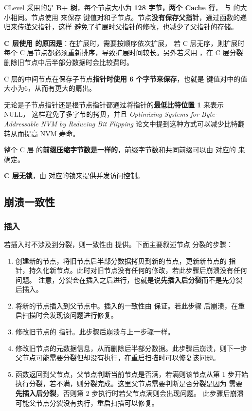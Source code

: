 \documentclass{mydoc}
\begin{document}
CLevel 采用的是 \textbf{B+ 树}，每个节点大小为 \textbf{128 字节，两个 Cache 行}，
与  的大小相同。节点使用 \textbf{} 来保存
键值对和子节点。节点\textbf{没有保存父指针}，通过函数的递归来传递父指针，这样
避免了扩展时父指针的修改，也减少了父指针的存储。

\textbf{C 层使用  的原因是}：在扩展时，需要按顺序依次扩展，
若 C 层无序，则扩展时每个 C 层节点都必须重新排序，导致扩展时间较长。另外若采用
，在 C 层分裂删除旧节点中后半部分数据时会比较费时。

C 层的中间节点在保存子节点\textbf{指针时使用 6 个字节来保存}，也就是 
键值对中的值大小为6，从而有更大的扇出。

无论是子节点指针还是根节点指针都通过将指针的\textbf{最低比特位置 1} 来表示 NULL，
这样避免了多字节的拷贝，并且 \emph{Optimizing Systems for Byte-Addressable NVM
by Reducing Bit Flipping} 论文中提到这种方式可以减少比特翻转从而提高 NVM 寿命。

整个 C 层  的\textbf{前缀压缩字节数是一样的}，前缀字节数和共同前缀可以由
对应的  来确定。

\textbf{C 层无锁}，由  对应的锁来提供并发访问控制。

\subsection{崩溃一致性}

\subsubsection{插入}

若插入时不涉及到分裂，则一致性由  提供。下面主要叙述节点
分裂的步骤：

\begin{enumerate}
  \item 创建新的节点，将旧节点后半部分数据拷贝到新的节点，更新新节点的 
        指针，持久化新节点。此时对旧节点没有任何的修改，若此步骤后崩溃没有任何问题。
        注意，分裂会在插入之后进行，也就是说\textbf{先插入后分裂}而不是先分裂后插入。
  \item 将新的节点插入到父节点中。插入的一致性由  保证。若此步骤
        后崩溃，在重启扫描时会发现该问题进行修复。
  \item 修改旧节点的  指针。此步骤后崩溃与上一步骤一样。
  \item 修改旧节点的元数据信息，从而删除后半部分数据。此步骤后崩溃，则下一步
        父节点可能需要分裂但却没有执行，在重启扫描时可以修复该问题。
  \item 函数返回到父节点，父节点判断当前节点是否满，若满则该节点从第 1 步开始
        执行分裂，若不满，则分裂完成。这里父节点需要判断是否分裂是因为
        需要\textbf{先插入后分裂}，否则第 2 步执行时若父节点满则会出现问题。
        此步骤后崩溃可能父节点分裂没有执行，重启扫描可以修复。
\end{enumerate}
\end{document}

